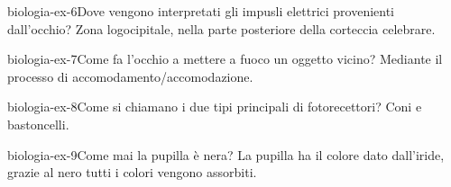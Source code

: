 \documentclass[preview]{standalone}
\begin{document}
\begin{snippetexercise}{biologia-ex-6}{Dove vengono interpretati gli impusli elettrici provenienti dall'occhio?}
    Zona logocipitale, nella parte posteriore della corteccia celebrare.
\end{snippetexercise}

\begin{snippetexercise}{biologia-ex-7}{Come fa l'occhio a mettere a fuoco un oggetto vicino?}
    Mediante il processo di accomodamento/accomodazione.
\end{snippetexercise}

\begin{snippetexercise}{biologia-ex-8}{Come si chiamano i due tipi principali di fotorecettori?}
    Coni e bastoncelli.
\end{snippetexercise}

\begin{snippetexercise}{biologia-ex-9}{Come mai la pupilla è nera?}
    La pupilla ha il colore dato dall'iride,
    grazie al nero tutti i colori vengono assorbiti.
\end{snippetexercise}
\end{document}

